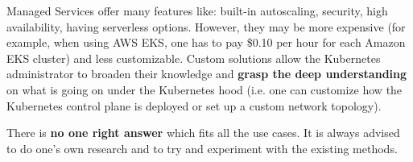 Managed Services offer many features like: built-in autoscaling, security, high availability, having serverless options. However, they may be more expensive (for example, when using AWS EKS, one has to pay \$0.10 per hour for each Amazon EKS cluster\cite{online-eks-pricing}) and less customizable. Custom solutions allow the Kubernetes administrator to broaden their knowledge and \textbf{grasp the deep understanding} on what is going on under the Kubernetes hood (i.e. one can customize how the Kubernetes control plane is deployed or set up a custom network topology).

There is \textbf{no one right answer} which fits all the use cases. It is always advised to do one's own research and to try and experiment with the existing methods.
